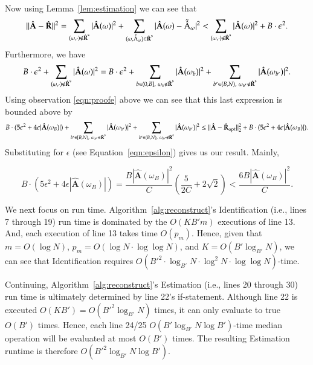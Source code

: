 \documentclass{article}
\begin{document}
Now using Lemma~\ref{lem:estimation} we can see that
$$\| \hat{\textbf{A}} - \hat{\textbf{R}}\|^{2} = \sum_{(\omega, \cdot) \notin \hat{\textbf{R}}^{\rm s}} |\hat{\textbf{A}}(\omega)|^{2} + \sum_{(\omega, \tilde{\hat{{\rm A}}}_{\omega}) \in \hat{\textbf{R}}^{\rm s}} |\hat{\textbf{A}}(\omega) - \tilde{\hat{{\rm A}}}_{\omega} |^{2} < \sum_{(\omega, \cdot) \notin \hat{\textbf{R}}^{\rm s}} |\hat{\textbf{A}}(\omega)|^{2} + B \cdot \epsilon^{2}.$$
Furthermore, we have
$$B \cdot \epsilon^{2} + \sum_{(\omega, \cdot) \notin \hat{\textbf{R}}^{\rm s}} |\hat{\textbf{A}}(\omega)|^{2} = B \cdot \epsilon^{2} + \sum_{b \in (0,B],~\omega_{b} \notin \hat{\textbf{R}}^{\rm s}} |\hat{\textbf{A}}(\omega_{b})|^{2} + \sum_{b' \in (B,N),~\omega_{b'} \notin \hat{\textbf{R}}^{\rm s}} |\hat{\textbf{A}}(\omega_{b'})|^{2}.$$
Using observation \ref{eqn:proofe} above we can see that this last expression is bounded above by
$$B \cdot ( 5\epsilon^{2} + 4 \epsilon | \hat{\textbf{A}}(\omega_{B}) | ) + \sum_{b' \in [B,N),~\omega_{b'} \in \hat{\textbf{R}}^{\rm s}} |\hat{\textbf{A}}(\omega_{b'})|^{2} + \sum_{b' \in (B,N),~\omega_{b'} \notin \hat{\textbf{R}}^{\rm s}} |\hat{\textbf{A}}(\omega_{b'})|^{2} \leq \| \hat{\textbf{A}} - \hat{\textbf{R}}_{\rm opt} \|^{2}_{2} + B \cdot ( 5\epsilon^{2} + 4 \epsilon | \hat{\textbf{A}}(\omega_{B}) | ).$$
Substituting for $\epsilon$ (see Equation~\ref{eqn:epsilon}) gives us our result.  Mainly,

$$B \cdot ( 5\epsilon^{2} + 4 \epsilon | \hat{\textbf{A}}(\omega_{B}) | ) = \frac{B| \hat{\textbf{A}}(\omega_{B}) |^{2}}{C} \left( \frac{5}{2C} + 2 \sqrt{2} \right) < \frac{6 B| \hat{\textbf{A}}(\omega_{B}) |^{2}}{C}.$$

We next focus on run time.  Algorithm~\ref{alg:reconstruct}'s Identification (i.e., lines 7 through 19) run time is dominated by the $O(K B' m)$ executions of line 13.  And, each execution of line 13 takes time $O(p_{m})$.  Hence, given that $m = O(\log N)$, $p_{m} = O(\log N \cdot \log\log N)$, and $K = O(B' \log_{B'} N)$, we can see that Identification requires $O(B'^{2} \cdot \log_{B'} N \cdot \log^{2} N  \cdot \log \log N)$-time.

Continuing, Algorithm~\ref{alg:reconstruct}'s Estimation (i.e., lines 20 through 30) run time is ultimately determined by line 22's {\sc if}-statement.  Although line 22 is executed $O(K B') = O(B'^{2} \log_{B'} N)$ times, it can only evaluate to true $O(B')$ times.  Hence, each line 24/25 $O(B' \log_{B'} N \log B')$-time median operation will be evaluated at most $O(B')$ times.  The resulting Estimation runtime is therefore $O(B'^{2} \log_{B'} N \log B')$.
\end{document}

